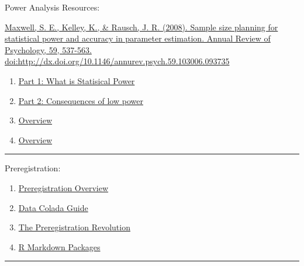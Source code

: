 \documentclass[
  openany]{book}
\providecommand{\tightlist}{%
  \setlength{\itemsep}{0pt}\setlength{\parskip}{0pt}}
\begin{document}
Power Analysis Resources:

\href{https://ezproxy.callutheran.edu/login?url=https://search-proquest-com.ezproxy.callutheran.edu/docview/205846542?accountid=9839}{Maxwell, S. E., Kelley, K., \& Rausch, J. R. (2008). Sample size planning for statistical power and accuracy in parameter estimation. Annual Review of Psychology, 59, 537-563. doi:http://dx.doi.org/10.1146/annurev.psych.59.103006.093735}

\begin{enumerate}
\def\labelenumi{\arabic{enumi}.}
\tightlist
\item
  \href{https://www.youtube.com/watch?v=-ZU7fbvSJ60}{Part 1: What is Statisical Power}
\item
  \href{https://www.youtube.com/watch?v=7daQRvRO-NE}{Part 2: Consequences of low power}
\item
  \href{https://www.youtube.com/watch?v=Lr-i4Ugoc5M}{Overview}
\item
  \href{https://www.youtube.com/watch?v=XhfkodpyIsw}{Overview}
\end{enumerate}

\begin{center}\rule{0.5\linewidth}{0.5pt}\end{center}

Preregistration:

\begin{enumerate}
\def\labelenumi{\arabic{enumi}.}
\tightlist
\item
  \href{https://www.cos.io/our-services/prereg}{Preregistration Overview}
\item
  \href{http://datacolada.org/64}{Data Colada Guide}
\item
  \href{https://www.pnas.org/content/115/11/2600}{The Preregistration Revolution}
\item
  \href{https://github.com/crsh/prereg\#prereg-r-markdown-templates-for-preregistrations-of-scientific-studies}{R Markdown Packages}
\end{enumerate}

\begin{center}\rule{0.5\linewidth}{0.5pt}\end{center}

  
\end{document}
